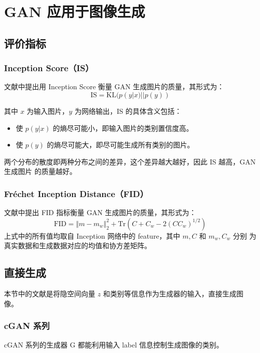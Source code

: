 \chapter{GAN 应用于图像生成}

\section{评价指标}

\subsection{Inception Score（IS）}
文献中提出用 Inception Score 衡量 GAN 生成图片的质量，其形式为：
\begin{equation}
  \label{equ:IS-score}
  \mathrm{IS} = \mathrm{KL}(p(y|x) || p(y))
\end{equation}

其中 $x$ 为输入图片，$y$ 为网络输出，IS 的具体含义包括：

\begin{itemize}
  \item 使 $p(y|x)$ 的熵尽可能小，即输入图片的类别置信度高。
  \item 使 $p(y)$ 的熵尽可能大，即尽可能生成所有类别的图片。
\end{itemize}

两个分布的散度即两种分布之间的差异，这个差异越大越好，因此 IS 越高，GAN 生成图片
的质量越好。

\subsection{Fréchet Inception Distance（FID）}
文献中提出 FID 指标衡量 GAN 生成图片的质量，其形式为：
\begin{equation}
  \label{equ:FID}
  \mathrm{FID} = \left\Vert m-m_w \right\Vert _{2}^2 + \mathrm{Tr} \left( C + C_w - 2 \left( C C_w \right)^{1/2} \right)
\end{equation}
上式中的所有值均取自 Inception 网络中的 feature，其中 $m, C$ 和 $m_w, C_w$ 分别
为真实数据和生成数据对应的均值和协方差矩阵。

\section{直接生成}
本节中的文献是将隐空间向量 $z$ 和类别等信息作为生成器的输入，直接生成图像。

\subsection{cGAN 系列}
cGAN 系列的生成器 G 都能利用输入 label 信息控制生成图像的类别。

